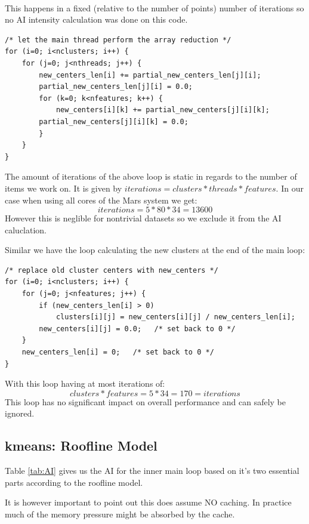 \paragraph{} This happens in a fixed (relative to the number of points) number of iterations so no AI intensity calculation was done on this code.


\begin{lstlisting}[caption={Reduction pt1}]
/* let the main thread perform the array reduction */
for (i=0; i<nclusters; i++) {
	for (j=0; j<nthreads; j++) {
		new_centers_len[i] += partial_new_centers_len[j][i];
		partial_new_centers_len[j][i] = 0.0;
		for (k=0; k<nfeatures; k++) {
			new_centers[i][k] += partial_new_centers[j][i][k];
		partial_new_centers[j][i][k] = 0.0;
		}
	}
}
\end{lstlisting}

The amount of iterations of the above loop is static in regards to the number of items we work on.
It is given by $ iterations = clusters * threads * features$.
In our case when using all cores of the Mars system we get:
$$ iterations = 5 * 80  * 34 = 13600$$
However this is neglible for nontrivial datasets so we exclude it from the AI caluclation.

Similar we have the loop calculating the new clusters at the end of the main loop:
\begin{lstlisting}[caption={Reduction pt2}]
/* replace old cluster centers with new_centers */
for (i=0; i<nclusters; i++) {
	for (j=0; j<nfeatures; j++) {
		if (new_centers_len[i] > 0)
			clusters[i][j] = new_centers[i][j] / new_centers_len[i];
		new_centers[i][j] = 0.0;   /* set back to 0 */
	}
	new_centers_len[i] = 0;   /* set back to 0 */
}
\end{lstlisting}
With this loop having at most iterations of:
$$clusters * features = 5 * 34 = 170 = iterations$$
This loop has no significant impact on overall performance and can safely be ignored.

\subsection{kmeans: Roofline Model}

Table \ref{tab:AI} gives us the AI for the inner main loop based on it's two essential parts according to the roofline model.

It is however important to point out this does assume NO caching. In practice much of the memory pressure might be absorbed by the cache.

